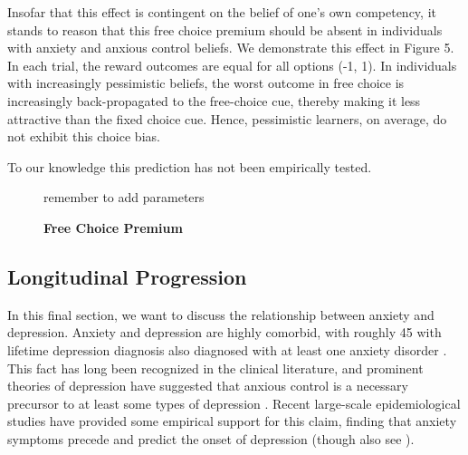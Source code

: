 \documentclass[11pt]{article} %
\begin{document}
Insofar that this effect is contingent on the belief of one's own competency,
it stands to reason that this free choice premium should be absent in individuals
with anxiety and anxious control beliefs. We demonstrate this effect in Figure 5.
In each trial, the reward outcomes are equal for all options (-1, 1). In individuals
with increasingly pessimistic beliefs, the worst outcome in free choice is increasingly
back-propagated to the free-choice cue, thereby making it less attractive than
the fixed choice cue. Hence, pessimistic learners, on average, do not exhibit
this choice bias.

To our knowledge this prediction has not been empirically tested.

\begin{figure}
  \centerline{%
  }
  \caption{\textbf{Free Choice Premium}}
  \par remember to add parameters
\end{figure}

\subsection{Longitudinal Progression}

In this final section, we want to discuss the relationship between anxiety and
depression. Anxiety and depression are highly comorbid, with roughly 45%
with lifetime depression diagnosis also diagnosed with at least one anxiety disorder
\citep{kessler2015}. This fact has long been recognized in the clinical literature,
and prominent theories of depression have suggested that anxious control is a necessary
precursor to at least some types of depression \citep{alloy1990}. Recent large-scale
epidemiological studies have provided  some empirical support for this claim, finding that
anxiety symptoms precede and predict the onset of depression \citep{mathew2011, jacobson2014,
kessler2015} (though also see \cite{jacobson2017, plana2019}).
\end{document}
